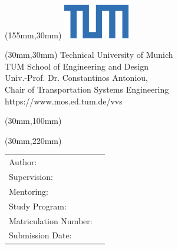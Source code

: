 
\begin{titlepage}
\begin{textblock*}{50mm}(155mm,30mm)
    \includegraphics[height=15mm]{DefaultTemplate/Logos/TUM1.png}
\end{textblock*}
\begin{textblock*}{90mm}(30mm,30mm)
    \footnotesize{
    Technical University of Munich\\
    TUM School of Engineering and Design\\
    Univ.-Prof. Dr. Constantinos Antoniou, \\
    Chair of Transportation Systems Engineering\\
    https://www.mos.ed.tum.de/vvs
    }
\end{textblock*}
\begin{textblock*}{150mm}(30mm,100mm)
  {\huge\bfseries\getTitle{}}
  \vspace{15mm}
   \\{\Large\getsubTitle{}} 
\end{textblock*}
\begin{textblock*}{150mm}(30mm,220mm)
    \begin{tabular}{l l}
Author:                     &\getAuthor{} \\
Supervision:                &\getSupervisor{} \\
Mentoring:                  &\getMentor{}\\
Study Program:              &\getCourseofStudy{} \\
Matriculation Number:       &\getAuthorMatrNr{}\\
Submission Date:            &\getSubmissionDate{} \\
    \end{tabular}
\end{textblock*}
\null
\end{titlepage}
